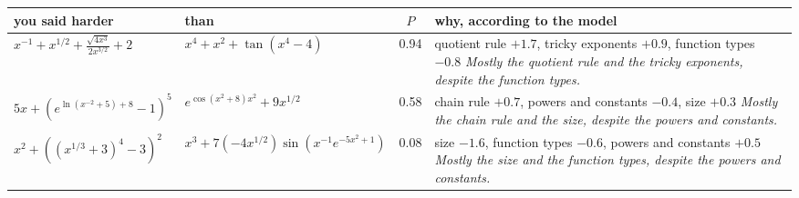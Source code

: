 {\renewcommand{\arraystretch}{1.3}\begin{tabular}{llcp{4.3cm}}
\toprule
you said harder & than & $P$ & why, according to the model \\
\midrule
$\displaystyle x^{-1} + x^{1/2} + \frac{\sqrt{4 x^{3}}}{2 x^{3/2}} + 2$ & $\displaystyle x^{4} + x^{2} + \tan\left(x^{4} - 4\right)$ & 0.94 & \parbox[t]{4.2cm}{\raggedright quotient rule $+1.7$, tricky exponents $+0.9$, function types $-0.8$\\ \emph{Mostly the quotient rule and the tricky exponents, despite the function types.}} \\[6pt]
$\displaystyle 5 x + \left(e^{\ln\left(x^{-2} + 5\right) + 8} - 1\right)^{5}$ & $\displaystyle e^{\cos\left(x^{2} + 8\right) x^{2}} + 9 x^{1/2}$ & 0.58 & \parbox[t]{4.2cm}{\raggedright chain rule $+0.7$, powers and constants $-0.4$, size $+0.3$\\ \emph{Mostly the chain rule and the size, despite the powers and constants.}} \\[6pt]
$\displaystyle x^{2} + \left(\left(x^{1/3} + 3\right)^{4} - 3\right)^{2}$ & $\displaystyle x^{3} + 7 \left(-4 x^{1/2}\right) \sin\left(x^{-1} e^{-5 x^{2} + 1}\right)$ & 0.08 & \parbox[t]{4.2cm}{\raggedright size $-1.6$, function types $-0.6$, powers and constants $+0.5$\\ \emph{Mostly the size and the function types, despite the powers and constants.}} \\[6pt]
\bottomrule
\end{tabular}}
